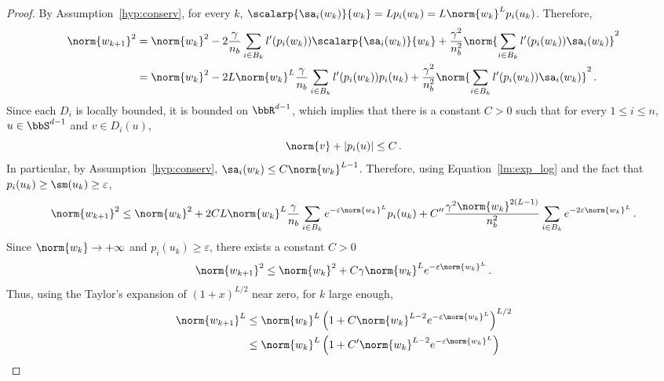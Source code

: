 \begin{proof}
  By Assumption~\ref{hyp:conserv}, for every $k$, $\scalarp{\sa_i(w_k)}{w_k} = Lp_i(w_k) =L \norm{w_k}^L p_i(u_k)$. Therefore,
  \begin{equation}\label{eq:est_wk}
    \begin{split}
      \norm{w_{k+1}}^2 &= \norm{w_k}^2 - 2\frac{\gamma}{n_b} \sum_{i\in B_k} l'(p_i(w_k)) \scalarp{\sa_i(w_k)}{w_k} + \frac{\gamma^2}{n_b^2} \norm{\sum_{i\in B_k}l'(p_i(w_k)) \sa_i(w_k)}^2\\
      &=\norm{w_k}^2 - 2L \norm{w_k}^L \frac{\gamma}{n_b} \sum_{i \in B_k} l'(p_i(w_k)) p_i(u_k) + \frac{\gamma^2}{n_b^2} \norm{\sum_{i\in B_k}l'(p_i(w_k)) \sa_i(w_k)}^2\, .
    \end{split}
  \end{equation}
  Since each $D_i$ is locally bounded, it is bounded on $\bbR^{d-1}$, which implies that there is a constant $C >0$ such that for every $1 \leq i \leq n$, $u \in \bbS^{d-1}$ and $v \in D_i(u)$,
  \begin{equation*}
    \norm{v} + |p_i(u)| \leq C\, .
  \end{equation*} 
  In particular, by Assumption~\ref{hyp:conserv}, $\sa_i(w_k) \leq C \norm{w_k}^{L-1}$.
  Therefore, using Equation~\eqref{lm:exp_log} and the fact that $p_i(u_k) \geq \sm(u_k) \geq \varepsilon$,
  \begin{equation*}
    \begin{split}
      \norm{w_{k+1}}^2 \leq \norm{w_k}^2 +  2CL\norm{w_k}^L \frac{\gamma}{n_b}\sum_{i \in B_k} e^{-\varepsilon \norm{w_k}^L}p_i(u_k)  + C''\frac{\gamma^2\norm{w_k}^{2(L-1)}}{n_b^2} \sum_{i\in B_k} e^{-2\varepsilon \norm{w_k}^L} \,.
    \end{split}
  \end{equation*}
Since $\norm{w_k} \rightarrow + \infty$ and $p_i(u_k) \geq \varepsilon$, there exists a constant $C>0$
  \begin{equation*}
    \norm{w_{k+1}}^2 \leq \norm{w_k}^2 + C \gamma\norm{w_k}^L e^{-\varepsilon \norm{w_k}^L}\, .
  \end{equation*}
  Thus, using the Taylor's expansion of $(1+x)^{L/2}$ near zero, for $k$ large enough,
  \begin{equation*}
    \begin{split}
    \norm{w_{k+1}}^L &\leq \norm{w_k}^L \left( 1 + C\norm{w_k}^{L-2} e^{-\varepsilon\norm{w_k}^L } \right)^{L/2}\\
    &\leq \norm{w_k}^L \left(1 + C' \norm{w_k}^{L-2}e^{-\varepsilon\norm{w_k}^L } \right)\\

\end{split}
\end{equation*}
\end{proof}
